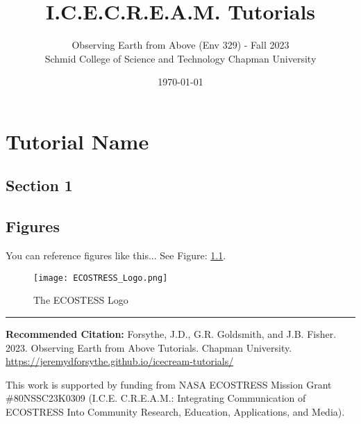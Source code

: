 \documentclass[oneside,a4paper,11pt,explicit]{book}
\title{I.C.E.C.R.E.A.M. Tutorials}
\subtitle{\small Observing Earth from Above (Env 329) - Fall 2023  \\
	\small Schmid College of Science and Technology Chapman University}
\date{\today}
\begin{document}
\setcounter{chapter}{3} %

\chapter{Tutorial Name} %

\section{Section 1}

\lipsum[1]

\section{Figures}
\lipsum[3] 

\vspace{2em}

You can reference figures like this... See Figure: \ref{fig:ECOSTRESS_Logo}.

\vspace{2em}

\lipsum[5] 

\begin{figure}[h]
    \centering
    \texttt{[image: ECOSTRESS\_Logo.png]}
    \caption{The ECOSTESS Logo}
    \label{fig:ECOSTRESS_Logo}
\end{figure}

\lipsum[2]

\vfill

\hrule

\vspace{2em}

\textbf{Recommended Citation:} Forsythe, J.D., G.R. Goldsmith, and J.B. Fisher. 2023. Observing Earth from Above Tutorials. Chapman University. \url{https://jeremydforsythe.github.io/icecream-tutorials/}

\vspace{1em}

This work is supported by funding from NASA ECOSTRESS Mission Grant \#80NSSC23K0309 (I.C.E. C.R.E.A.M.: Integrating Communication of ECOSTRESS Into Community Research, Education, Applications, and Media).
\end{document}
